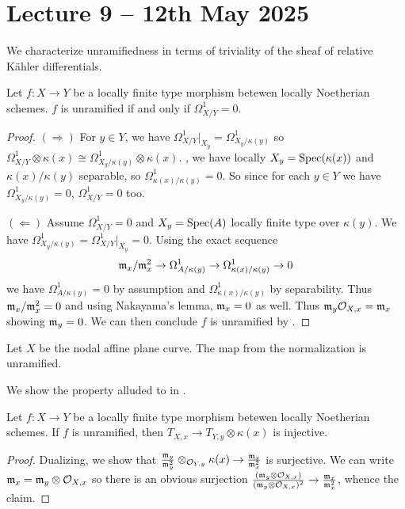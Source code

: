 \section{Lecture 9 -- 12th May 2025}\label{sec: lecture 9}
We characterize unramifiedness in terms of triviality of the sheaf of relative K\"{a}hler differentials. 
\begin{proposition}\label{prop: unramified iff trivial relative differentials}
    Let $f:X\to Y$ be a locally finite type morphism betewen locally Noetherian schemes. $f$ is unramified if and only if $\Omega^{1}_{X/Y}=0$. 
\end{proposition}
\begin{proof}
    $(\Rightarrow)$ For $y\in Y$, we have $\Omega^{1}_{X/Y}|_{X_{y}}=\Omega^{1}_{X_{y}/\kappa(y)}$ so $\Omega^{1}_{X/Y}\otimes\kappa(x)\cong\Omega^{1}_{X_{y}/\kappa(y)}\otimes\kappa(x)$. , we have locally $X_{y}=\operatorname{Spec}(\kappa(x))$ and $\kappa(x)/\kappa(y)$ separable, so $\Omega^{1}_{\kappa(x)/\kappa(y)}=0$. So since for each $y\in Y$ we have $\Omega^{1}_{X_{y}/\kappa(y)}=0$, $\Omega^{1}_{X/Y}=0$ too. 

    $(\Leftarrow)$ Assume $\Omega^{1}_{X/Y}=0$ and $X_{y}=\operatorname{Spec}(A)$ locally finite type over $\kappa(y)$. We have $\Omega^{1}_{X_{y}/\kappa(y)}=\Omega^{1}_{X/Y}|_{X_{y}}=0$. Using the exact sequence 
    $$\mathfrak{m}_{x}/\mathfrak{m}_{x}^{2}\to\Omega^{1}_{A/\kappa(y)}\to\Omega^{1}_{\kappa(x)/\kappa(y)}\to0$$
    we have $\Omega^{1}_{A/\kappa(y)}=0$ by assumption and $\Omega^{1}_{\kappa(x)/\kappa(y)}$ by separability. Thus $\mathfrak{m}_{x}/\mathfrak{m}_{x}^{2}=0$ and using Nakayama's lemma, $\mathfrak{m}_{x}=0$ as well. Thus $\mathfrak{m}_{y}\mathcal{O}_{X,x}=\mathfrak{m}_{x}$ showing $\mathfrak{m}_{y}=0$. We can then conclude $f$ is unramified by . 
\end{proof}
\begin{example}
    Let $X$ be the nodal affine plane curve. The map from the normalization is unramified. 
\end{example}
We show the property alluded to in . 
\begin{lemma}\label{lem: unramified implies immersion}
    Let $f:X\to Y$ be a locally finite type morphism betewen locally Noetherian schemes. If $f$ is unramified, then $T_{X,x}\to T_{Y,y}\otimes\kappa(x)$ is injective. 
\end{lemma}
\begin{proof}
    Dualizing, we show that $\frac{\mathfrak{m}_{y}}{\mathfrak{m}_{y}^{2}}\otimes_{\mathcal{O}_{Y,y}}\kappa(x)\to\frac{\mathfrak{m}_{x}}{\mathfrak{m}_{x}^{2}}$ is surjective. We can write $\mathfrak{m}_{x}=\mathfrak{m}_{y}\otimes\mathcal{O}_{X,x}$ so there is an obvious surjection $\frac{(\mathfrak{m}_{y}\otimes\mathcal{O}_{X,x})}{(\mathfrak{m}_{y}\otimes\mathcal{O}_{X,x})^{2}}\to\frac{\mathfrak{m}_{x}}{\mathfrak{m}_{x}^{2}}$, whence the claim. 
\end{proof}
